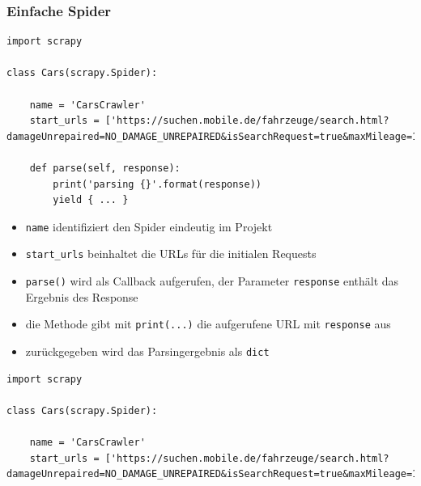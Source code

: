 \documentclass{beamer}
\begin{document}

\begin{frame}
	\frametitle{Einfache Spider}
			\begin{lstlisting}
import scrapy
			
class Cars(scrapy.Spider):
    
    name = 'CarsCrawler'
    start_urls = ['https://suchen.mobile.de/fahrzeuge/search.html?damageUnrepaired=NO_DAMAGE_UNREPAIRED&isSearchRequest=true&maxMileage=100&maxPowerAsArray=PS&minPowerAsArray=35&minPowerAsArray=PS&minPrice=5000&scopeId=C&usage=NEW&usageType=PRE_REGISTRATION']
    
    def parse(self, response):
        print('parsing {}'.format(response))
        yield { ... }
        	\end{lstlisting}
			
	\framebreak
	
	
	\begin{itemize}
		\item \lstinline|name| identifiziert den Spider eindeutig im Projekt
		\item \lstinline|start_urls| beinhaltet die URLs für die initialen Requests
		\item \lstinline|parse()| wird als Callback aufgerufen, der Parameter \lstinline|response| enthält das Ergebnis des Response
		\item die Methode gibt mit \lstinline|print(...)| die aufgerufene URL mit
		\lstinline|response| aus
		\item zurückgegeben wird das Parsingergebnis als \lstinline|dict|
		
	\end{itemize}
	
	\framebreak
	
	
			\begin{lstlisting}
import scrapy
			
class Cars(scrapy.Spider):
    
    name = 'CarsCrawler'
    start_urls = ['https://suchen.mobile.de/fahrzeuge/search.html?damageUnrepaired=NO_DAMAGE_UNREPAIRED&isSearchRequest=true&maxMileage=100&maxPowerAsArray=PS&minPowerAsArray=35&minPowerAsArray=PS&minPrice=5000&scopeId=C&usage=NEW&usageType=PRE_REGISTRATION']
    

\end{lstlisting}
\end{frame}
\end{document}
